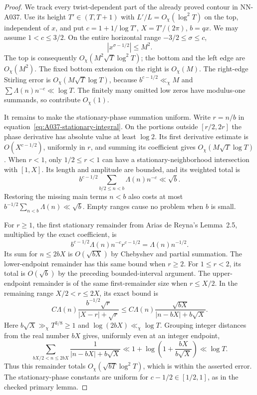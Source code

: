 \begin{proof}
We track every twist-dependent part of the already proved contour
in NN-A037. Use its height $T'\in(T,T+1)$ with
$L'/L=O_\chi(\log^2T)$ on the top, independent of $x$, and put
$c=1+1/\log T'$, $X=T'/(2\pi)$, $b=qx$. We may assume
$1<c\le3/2$. On the entire horizontal range
$-3/2\le\sigma\le c$,
\[
                         |x^{\sigma-1/2}|\le M^2.
\]
The top is consequently $O_\chi(M^2\sqrt T\log^2T)$;
the bottom and the left edge are $O_\chi(M^2)$.
The fixed bottom extension on the right is $O_\chi(M)$.
The right-edge Stirling error is
$O_\chi(M\sqrt T\log T)$, because
$b^{c-1/2}\ll_\chi M$ and
$\sum\Lambda(n)n^{-c}\ll\log T$.
The finitely many omitted low zeros have modulus-one summands,
so contribute $O_\chi(1)$.

It remains to make the stationary-phase summation uniform.
Write $r=n/b$ in equation~\eqref{eq:A037-stationary-integral}.
On the portions outside $[r/2,2r]$ the phase derivative has
absolute value at least $\log2$. Its first derivative estimate
is $O(X^{c-1/2})$, uniformly in $r$, and summing its coefficient
gives $O_\chi(M\sqrt T\log T)$. When $r<1$, only
$1/2\le r<1$ can have a stationary-neighborhood intersection
with $[1,X]$. Its length and amplitude are bounded, and its
weighted total is
\[
 b^{c-1/2}\sum_{b/2\le n<b}\Lambda(n)n^{-c}
                                           \ll\sqrt b.
\]
Restoring the missing main terms $n<b$ also costs at most
$b^{-1/2}\sum_{n<b}\Lambda(n)\ll\sqrt b$. Empty ranges cause
no problem when $b$ is small.

For $r\ge1$, the first stationary remainder from Arias de
Reyna's Lemma~2.5, multiplied by the exact coefficient, is
\[
 b^{c-1/2}\Lambda(n)n^{-c}r^{c-1/2}
                              =\Lambda(n)n^{-1/2}.
\]
Its sum for $n\le2bX$ is $O(\sqrt{bX})$ by Chebyshev and
partial summation. The lower-endpoint remainder has this same
bound when $r\ge2$. For $1\le r<2$, its total is
$O(\sqrt b)$ by the preceding bounded-interval argument.
The upper-endpoint remainder is of the same first-remainder
size when $r\le X/2$. In the remaining range
$X/2<r\le2X$, its exact bound is
\[
 C\Lambda(n)\frac{b^{-1/2}\sqrt r}
                       {|X-r|+\sqrt r}
 \le C\Lambda(n)\frac{\sqrt{bX}}
                       {|n-bX|+b\sqrt X}.
\]
Here $b\sqrt X\gg_\chi T^{3/8}\ge1$ and
$\log(2bX)\ll_\chi\log T$. Grouping integer distances from
the real number $bX$ gives, uniformly even at an integer endpoint,
\[
 \sum_{bX/2<n\le2bX}
       \frac1{|n-bX|+b\sqrt X}
 \ll 1+\log\left(1+\frac{bX}{b\sqrt X}\right)
 \ll\log T.
\]
Thus this remainder totals
$O_\chi(\sqrt{bT}\log^2T)$, which is within the asserted
error. The stationary-phase constants are uniform for
$c-1/2\in[1/2,1]$, as in the checked primary lemma.


\end{proof}
